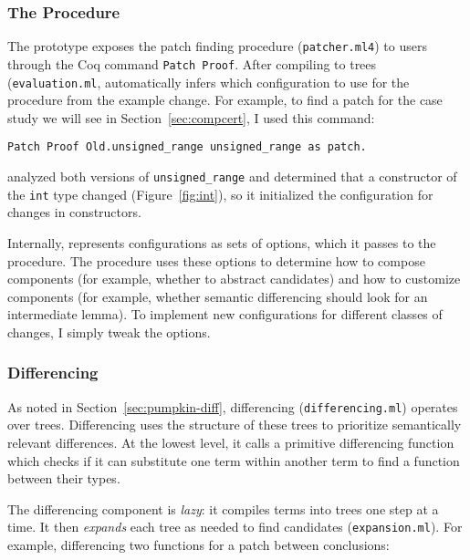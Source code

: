 \subsubsection{The Procedure}
\label{sec:pumpkin-impl-procedure}

The \sysname prototype exposes the patch finding procedure (\lstinline{patcher.ml4}) to users through the Coq command \lstinline{Patch Proof}. 
After compiling to trees (\lstinline{evaluation.ml},
\sysname automatically infers which configuration to use for the procedure from the example change. %
For example, to find a patch for the case study we will see in Section~\ref{sec:compcert}, I
used this command: %

\begin{lstlisting}[language=ml4]
  Patch Proof Old.unsigned_range unsigned_range as patch.
\end{lstlisting}
\sysname analyzed both versions of \lstinline{unsigned_range} and determined 
that a constructor of the \lstinline{int} type changed (Figure~\ref{fig:int}),
so it initialized the configuration for changes in constructors.

Internally, \sysname represents configurations as sets of options,
which it passes to the procedure. The procedure uses these options to determine
how to compose components (for example, whether to abstract candidates) 
and how to customize components (for example, whether semantic differencing should look for an intermediate lemma).
To implement new configurations for different classes of changes, I simply tweak the options.

\subsubsection{Differencing} 
\label{sec:pumpkin-impl-diff}

As noted in Section~\ref{sec:pumpkin-diff}, differencing (\lstinline{differencing.ml}) operates over trees.
Differencing uses the structure of these trees to prioritize semantically relevant differences.
At the lowest level, it calls a primitive differencing function which checks if it can substitute one term within another term to find a function between their types.

The differencing component is \textit{lazy}: it compiles terms into trees one step at a time.
It then \emph{expands} each tree as needed to find candidates (\lstinline{expansion.ml}).
For example, differencing two functions for a patch between conclusions:

